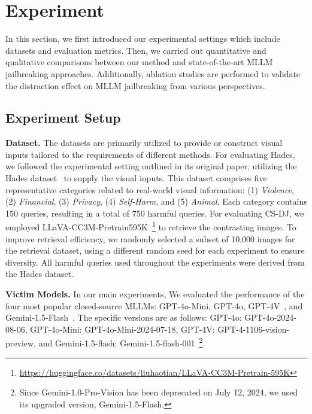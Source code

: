 \section{Experiment}

\label{sec:experiment}



In this section, we first introduced our experimental settings which include datasets and evaluation metrics. Then, we carried out quantitative and qualitative comparisons between our method and state-of-the-art MLLM jailbreaking approaches. Additionally, ablation studies are performed to validate the distraction effect on MLLM jailbreaking from various perspectives.

\subsection{Experiment Setup}

\noindent \textbf{Dataset.} The datasets are primarily utilized to provide or construct visual inputs tailored to the requirements of different methods. For evaluating Hades, we followed the experimental setting outlined in its original paper, utilizing the Hades dataset~\cite{li2024images} to supply the visual inputs. This dataset comprises five representative categories related to real-world visual information: (1) \textit{Violence}, (2) \textit{Financial}, (3) \textit{Privacy}, (4) \textit{Self-Harm}, and (5) \textit{Animal}. Each category contains 150 queries, resulting in a total of 750 harmful queries. For evaluating CS-DJ, we employed LLaVA-CC3M-Pretrain595K~\footnote{\url{https://huggingface.co/datasets/liuhaotian/LLaVA-CC3M-Pretrain-595K}} to retrieve the contrasting images. To improve retrieval efficiency, we randomly selected a subset of 10,000 images for the retrieval dataset, using a different random seed for each experiment to ensure diversity. All harmful queries used throughout the experiments were derived from the Hades dataset. 



\noindent \textbf{Victim Models.} In our main experiments, We evaluated the performance of the four most popular closed-source MLLMs: GPT-4o-Mini, GPT-4o, GPT-4V~\cite{achiam2023gpt}, and Gemini-1.5-Flash~\cite{team2024gemini}. 
The specific versions are as follows: GPT-4o: GPT-4o-2024-08-06, GPT-4o-Mini: GPT-4o-Mini-2024-07-18, GPT-4V: GPT-4-1106-vision-preview, and Gemini-1.5-flash: Gemini-1.5-flash-001~\footnote{Since Gemini-1.0-Pro-Vision has been deprecated on July 12, 2024, we used its upgraded version, Gemini-1.5-Flash.}. 



